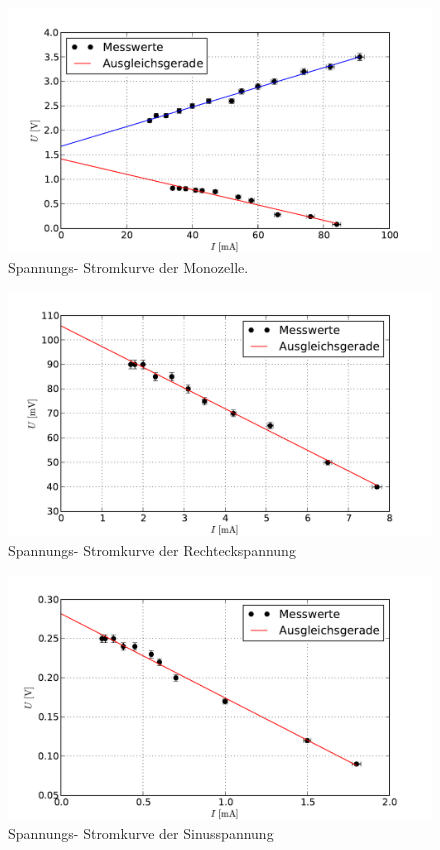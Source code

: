 		\begin{figure}[h]
			\centering
			\includegraphics[width = 15cm]{img/graph_monozelle.pdf}
			\caption{Spannungs- Stromkurve der Monozelle. \label{fig:graph_monozelle}}
		\end{figure}

		\begin{figure}[h]
			\centering
			\includegraphics[width = 15cm]{img/graph_rechteck.pdf}
			\caption{Spannungs- Stromkurve der Rechteckspannung \label{fig:graph_rechteck}}
		\end{figure}

		\begin{figure}[h]
			\centering
			\includegraphics[width = 15cm]{img/graph_sinus.pdf}
			\caption{Spannungs- Stromkurve der Sinusspannung \label{fig:graph_sinus}}
		\end{figure}

